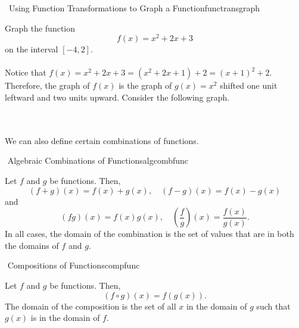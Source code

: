 		\begin{example}{\Difficulty\,\Difficulty\,\,Using Function Transformations to Graph a Function}{functransgraph}

			Graph the function
			\begin{equation*}
				f(x)=x^2+2x+3
			\end{equation*}
			on the interval \([-4,2]\).
			\\
			\\
			Notice that \(f(x)=x^2+2x+3=(x^2+2x+1)+2=(x+1)^2+2\). Therefore, the graph of \(f(x)\) is the graph of \(g(x)=x^2\) shifted one unit leftward and two units upward. Consider the following graph.
			\begin{center}
			\end{center}
			
		\end{example}
		\vphantom
		\\
		\\
		We can also define certain combinations of functions.
		\begin{definition}{\Stop\,\,Algebraic Combinations of Functions}{algcombfunc}
			
			Let \(f\) and \(g\) be functions. Then,
			\begin{equation*}
				(f+g)(x)=f(x)+g(x),\quad (f-g)(x)=f(x)-g(x)
			\end{equation*}
			and
			\begin{equation*}
				(fg)(x)=f(x)g(x),\quad \left(\frac{f}{g}\right)(x)=\frac{f(x)}{g(x)}.
			\end{equation*}
			In all cases, the domain of the combination is the set of values that are in both the domains of \(f\) and \(g\).

		\end{definition}
		\begin{definition}{\Stop\,\,Compositions of Functions}{compfunc}
			
			Let \(f\) and \(g\) be functions. Then,
			\begin{equation*}
				(f\circ g)(x)=f(g(x)).
			\end{equation*}
			The domain of the composition is the set of all \(x\) in the domain of \(g\) such that \(g(x)\) is in the domain of \(f\).

		\end{definition}
